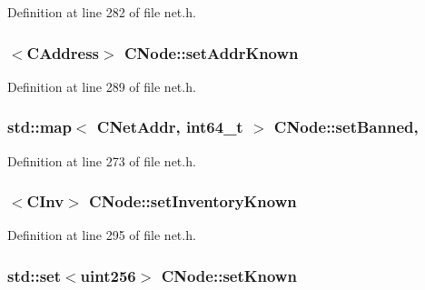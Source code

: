 Definition at line 282 of file net.\+h.

\hypertarget{class_c_node_ac21266ce880bd36b98ba7cfcc447a30f}{}
\subsubsection[{set\+Addr\+Known}]{$<${\bf C\+Address}$>$ C\+Node\+::set\+Addr\+Known}\label{class_c_node_ac21266ce880bd36b98ba7cfcc447a30f}


Definition at line 289 of file net.\+h.

\hypertarget{class_c_node_adf22d1873c1012ab3edb8a52253b203e}{}
\subsubsection[{set\+Banned}]{\setlength{\rightskip}{0pt plus 5cm}std\+::map$<$ {\bf C\+Net\+Addr}, {\bf int64\+\_\+t} $>$ C\+Node\+::set\+Banned\hspace{0.3cm}{\ttfamily [static]}, {\ttfamily [protected]}}\label{class_c_node_adf22d1873c1012ab3edb8a52253b203e}


Definition at line 273 of file net.\+h.

\hypertarget{class_c_node_ae15aa9a971040800c26bc87b1250220f}{}
\subsubsection[{set\+Inventory\+Known}]{$<${\bf C\+Inv}$>$ C\+Node\+::set\+Inventory\+Known}\label{class_c_node_ae15aa9a971040800c26bc87b1250220f}


Definition at line 295 of file net.\+h.

\hypertarget{class_c_node_ab1b30fa8e48005752f6b0bcf43eca478}{}
\subsubsection[{set\+Known}]{\setlength{\rightskip}{0pt plus 5cm}std\+::set$<${\bf uint256}$>$ C\+Node\+::set\+Known}\label{class_c_node_ab1b30fa8e48005752f6b0bcf43eca478}


